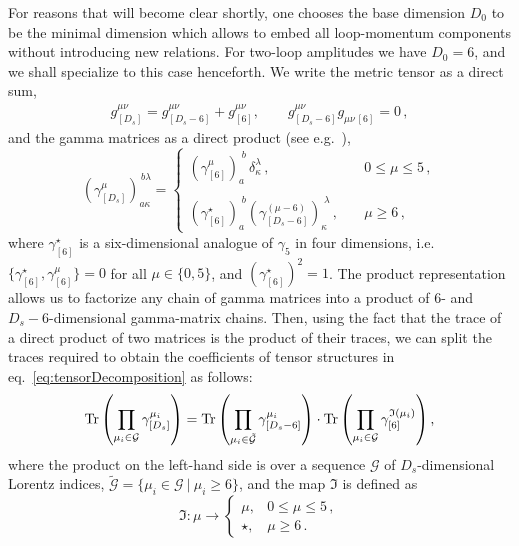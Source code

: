 For reasons that will become clear shortly, one chooses the base
dimension $D_0$ to be the minimal dimension which allows to embed 
all loop-momentum components without introducing new relations.
For two-loop amplitudes we have $D_0=6$, and we
shall specialize to this case henceforth. We write the metric tensor as
a direct sum,
  \begin{align}
    \label{eq:ds-split-metric}
    g^{\mu\nu}_{[D_s]}  = g^{\mu\nu}_{[D_s-6]} + g^{\mu\nu}_{[6]},  \qquad
    g^{\mu\nu}_{[D_s-6]}g^{\phantom{\mu\nu}}_{\mu\nu\,[6]} = 0\,,
  \end{align}
  and the gamma matrices as a direct product 
  (see e.g.\ \cite{Collins:1984xc,Kreuzer:susylectures}),
\begin{equation}
  (\gamma_{[D_s]}^\mu)_{a\kappa}^{\,b\lambda}  = \left\{ 
    \begin{array}{ll} 
      \left(\gamma_{[6]}^\mu\right)_a^{\;b} \,
      \delta_\kappa^\lambda\,, &\quad  0\le\mu \le 5 \,,\\&\\
      \left(\gamma^\star_{[6]}\right)_a^{\;b} 
      \left(\gamma_{[D_s-6]}^{(\mu-6)}\right)_\kappa^{\;\lambda}\,, 
      &\quad \mu \geq 6 \,,
    \end{array}
    \right.
    \label{eq:ds-gamma}
\end{equation}
where $\gamma^\star_{[6]}$ is a six-dimensional analogue of $\gamma_5$ in four dimensions, i.e.\ $\{\gamma^\star_{[6]},\gamma_{[6]}^\mu\} = 0$ for all $\mu \in \{0,5\}$, and $(\gamma^\star_{[6]})^2 = 1$.
The product representation allows us to factorize any chain of gamma matrices into a product of $6$- and $D_s-6$-dimensional gamma-matrix chains.
Then, using the fact that the trace of a direct product of two matrices is the product of their traces,
we can split the traces required to obtain the coefficients of tensor structures in eq.~\eqref{eq:tensorDecomposition}
as follows:
\begin{equation}
  \Tr\left(\prod_{\mu_i\in \mathcal{G}}\gamma^{\mu_i}_{[D_s]}\right) =
  \Tr\left(\prod_{\mu_i\in \tilde{\mathcal{G}}}\gamma^{\mu_i}_{[D_s-6]}\right) \cdot
  \Tr\left(\prod_{\mu_i\in \mathcal{G}}\gamma^{\mathfrak{I}(\mu_i)}_{[6]}\right),
  \label{eq:ds-split-traces}
\end{equation}
where the product on the left-hand side is over a sequence $\mathcal{G}$ of $D_s$-dimensional Lorentz indices,
$\tilde{\mathcal{G}} = \{ \mu_i \in \mathcal{G} ~\vert~ \mu_i \geq 6 \}$, and the map $\mathfrak{I}$ is defined as
\begin{equation}
  \mathfrak{I} : \mu \to
    \begin{cases}
      \mu, & 0\le\mu \le 5\,, \\
      \star, & \mu \geq 6\,.
    \end{cases}
\end{equation}
